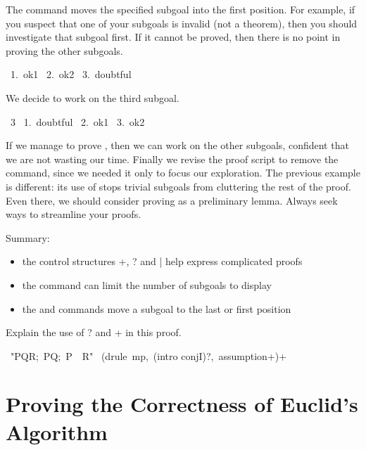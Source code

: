 \medskip
The  command moves the specified subgoal into the
first position.  For example, if you suspect that one of your subgoals is
invalid (not a theorem), then you should investigate that subgoal first.  If it
cannot be proved, then there is no point in proving the other subgoals.
\begin{isabelle}
\ 1.\ ok1\isanewline
\ 2.\ ok2\isanewline
\ 3.\ doubtful%
\end{isabelle}
%
We decide to work on the third subgoal.
\begin{isabelle}
\ 3\isanewline
\ 1.\ doubtful\isanewline
\ 2.\ ok1\isanewline
\ 3.\ ok2
\end{isabelle}
If we manage to prove , then we can work on the other
subgoals, confident that we are not wasting our time.  Finally we revise the
proof script to remove the  command, since we needed it only to
focus our exploration.  The previous example is different: its use of
 stops trivial subgoals from cluttering the rest of the
proof.  Even there, we should consider proving  as a preliminary
lemma.  Always seek ways to streamline your proofs.
 

\medskip
Summary:
\begin{itemize}
\item the control structures \isa+, \isa? and \isa| help express complicated proofs
\item the  command can limit the number of subgoals to display
\item the  and  commands move a 
subgoal to the last or first position
\end{itemize}

\begin{exercise}
Explain the use of \isa? and \isa+ in this proof.
\begin{isabelle}
\ "\isasymlbrakk P\isasymand Q\isasymlongrightarrow R;\ P\isasymlongrightarrow Q;\ P\isasymrbrakk \ \isasymLongrightarrow \ R"\isanewline
{}\ (drule\ mp,\ (intro conjI)?,\ assumption+)+
\end{isabelle}
\end{exercise}



\section{Proving the Correctness of Euclid's Algorithm}
\label{sec:proving-euclid}

